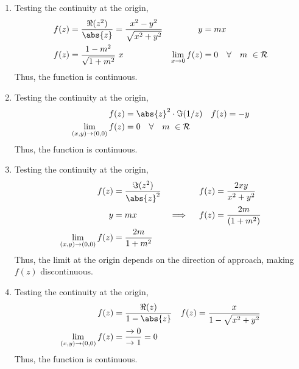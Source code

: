 \begin{enumerate}
    \item Testing the continuity at the origin,
          \begin{align}
              f(z)                                 & = \frac{\Re{(z^2)}}{\abs{z}}
              = \frac{x^2 - y^2}{\sqrt{x^2 + y^2}} &
              y                                    & = mx                             \\
              f(z)                                 & = \frac{1 - m^2}{\sqrt{1 + m^2}}
              \ x                                  &
              \lim_{x \to 0}f(z)                   & = 0 \quad \forall \quad
              m\ \in \mathcal{R}
          \end{align}
          Thus, the function is continuous.

    \item Testing the continuity at the origin,
          \begin{align}
              f(z)                       & = \abs{z}^2 \cdot \Im{(1/z)} &
              f(z)                       & = -y                           \\
              \lim_{(x,y) \to (0,0)}f(z) & = 0 \quad \forall \quad
              m\ \in \mathcal{R}
          \end{align}
          Thus, the function is continuous.

    \item Testing the continuity at the origin,
          \begin{align}
              f(z)                       & = \frac{\Im{(z^2)}}{\abs{z}^2} &
              f(z)                       & = \frac{2xy}{x^2 + y^2}          \\
              y                          & = mx                           &
              \implies \quad f(z)        & = \frac{2m}{(1 + m^2)}           \\
              \lim_{(x,y) \to (0,0)}f(z) & = \frac{2m}{1+m^2}
          \end{align}
          Thus, the limit at the origin depends on the direction of approach, making
          $ f(z) $ discontinuous.

    \item Testing the continuity at the origin,
          \begin{align}
              f(z)                       & = \frac{\Re{(z)}}{1 - \abs{z}} &
              f(z)                       & = \frac{x}{1-\sqrt{x^2 + y^2}}   \\
              \lim_{(x,y) \to (0,0)}f(z) & = \frac{\to 0}
              {\to 1} = 0
          \end{align}
          Thus, the function is continuous.


\end{enumerate}
